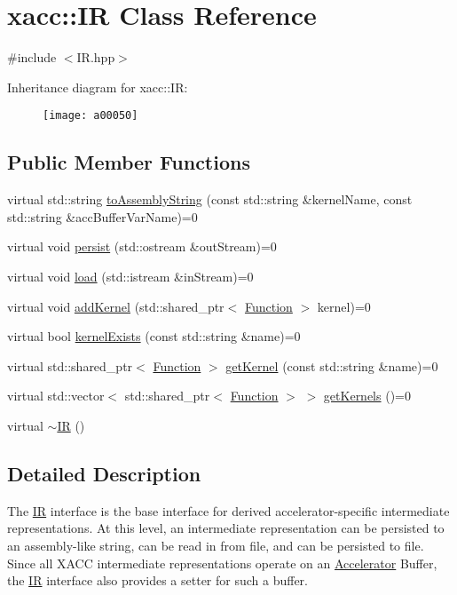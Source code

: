 \hypertarget{a00050}{}\section{xacc\+:\+:IR Class Reference}
\label{a00050}


{\ttfamily \#include $<$I\+R.\+hpp$>$}

Inheritance diagram for xacc\+:\+:IR\+:\begin{figure}[H]
\begin{center}
\leavevmode
\texttt{[image: a00050]}
\end{center}
\end{figure}
\subsection*{Public Member Functions}
\begin{DoxyCompactItemize}
\item 
virtual std\+::string \hyperlink{a00050_a8356cdff1919b88eabeb84fd7450cdb6}{to\+Assembly\+String} (const std\+::string \&kernel\+Name, const std\+::string \&acc\+Buffer\+Var\+Name)=0
\item 
virtual void \hyperlink{a00050_a414b72224d88473ad6190bb88102a3ea}{persist} (std\+::ostream \&out\+Stream)=0
\item 
virtual void \hyperlink{a00050_a444c2e4dc0faac500fb70fa93997e9bc}{load} (std\+::istream \&in\+Stream)=0
\item 
virtual void \hyperlink{a00050_abbbf8e6993c518597de32cd05d49d737}{add\+Kernel} (std\+::shared\+\_\+ptr$<$ \hyperlink{a00038}{Function} $>$ kernel)=0
\item 
virtual bool \hyperlink{a00050_afc9ccf5126f3fed19c2e879133b2f6d8}{kernel\+Exists} (const std\+::string \&name)=0
\item 
virtual std\+::shared\+\_\+ptr$<$ \hyperlink{a00038}{Function} $>$ \hyperlink{a00050_a6f49b4ba4b3a15142b04873284885f0d}{get\+Kernel} (const std\+::string \&name)=0
\item 
virtual std\+::vector$<$ std\+::shared\+\_\+ptr$<$ \hyperlink{a00038}{Function} $>$ $>$ \hyperlink{a00050_a88c50bfc5b279145360ddc0c3a703b9b}{get\+Kernels} ()=0
\item 
virtual \hyperlink{a00050_a09a76d71092254acae07e19fa2f34921}{$\sim$\+IR} ()
\end{DoxyCompactItemize}


\subsection{Detailed Description}
The \hyperlink{a00050}{IR} interface is the base interface for derived accelerator-\/specific intermediate representations. At this level, an intermediate representation can be persisted to an assembly-\/like string, can be read in from file, and can be persisted to file. Since all X\+A\+CC intermediate representations operate on an \hyperlink{a00011}{Accelerator} Buffer, the \hyperlink{a00050}{IR} interface also provides a setter for such a buffer. 

